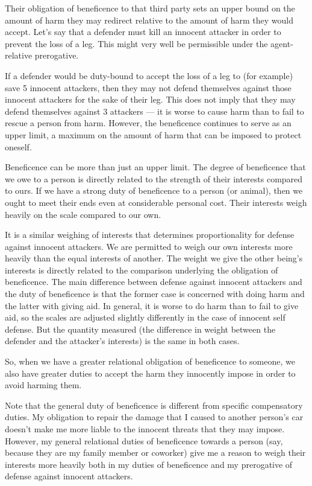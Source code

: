 		Their obligation of beneficence to that third party sets an upper bound
		on the amount of harm they may redirect relative to the amount of harm
		they would accept. Let’s say that a defender must kill an innocent
		attacker in order to prevent the loss of a leg. This might very well
		be permissible under the agent-relative prerogative.

		If a defender would be duty-bound to accept the loss of a leg to (for
		example) save 5 innocent attackers, then they may not defend themselves
		against those innocent attackers for the sake of their leg. This does
		not imply that they may defend themselves against 3 attackers --- it is
		worse to cause harm than to fail to rescue a person from harm. However,
		the beneficence continues to serve as an upper limit, a maximum on the
		amount of harm that can be imposed to protect oneself.

		Beneficence can be more than just an upper limit. The degree of
		beneficence that we owe to a person is directly related to the strength
		of their interests compared to ours. If we have a strong duty of
		beneficence to a person (or animal), then we ought to meet their ends
		even at considerable personal cost. Their interests weigh heavily on
		the scale compared to our own. 

		It is a similar weighing of interests that determines proportionality
		for defense against innocent attackers. We are permitted to weigh our
		own interests more heavily than the equal interests of another. The
		weight we give the other being’s interests is directly related to the
		comparison underlying the obligation of beneficence. The main difference
		between defense against innocent attackers and the duty of beneficence
		is that the former case is concerned with doing harm and the latter
		with giving aid. In general, it is worse to do harm than to fail to
		give aid, so the scales are adjusted slightly differently in the case
		of innocent self defense. But the quantity measured (the difference in
		weight between the defender and the attacker’s interests) is the same
		in both cases.

		So, when we have a greater relational obligation of beneficence to
		someone, we also have greater duties to accept the harm they innocently
		impose in order to avoid harming them.

		Note that the general duty of beneficence is different from specific
		compensatory duties. My obligation to repair the damage that I caused
		to another person’s car doesn’t make me more liable to the innocent
		threats that they may impose. However, my general relational duties
		of beneficence towards a person (say, because they are my family member
		or coworker) give me a reason to weigh their interests more heavily both
		in my duties of beneficence and my prerogative of defense against
		innocent attackers.

